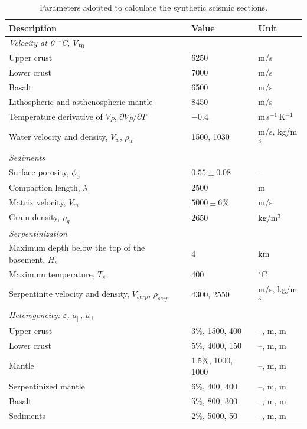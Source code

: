 \begin{table}[ht]
  \centering
  \caption{Parameters adopted to calculate the synthetic seismic sections.}
  \label{tab:seismic}
  \small
  \begin{tabular}{lll}
    \toprule
    Description & Value & Unit \\
    \midrule
    \multicolumn{3}{l}{\textit{Velocity at 0~$^\circ$C, $V_{P0}$}} \\
    \quad Upper crust & 6250 & m/s \\
    \quad Lower crust & 7000 & m/s \\
    \quad Basalt & 6500 & m/s \\
    \quad Lithospheric and asthenospheric mantle & 8450 & m/s \\
    Temperature derivative of $V_P$, $\partial V_P / \partial T$ & $-0.4$ & m\,s$^{-1}$\,K$^{-1}$ \\
    Water velocity and density, $V_w$, $\rho_w$ & 1500, 1030 & m/s, kg/m$^3$ \\
    \multicolumn{3}{l}{\textit{Sediments}} \\
    \quad Surface porosity, $\phi_0$ & $0.55 \pm 0.08$ & -- \\
    \quad Compaction length, $\lambda$ & 2500 & m \\
    \quad Matrix velocity, $V_m$ & $5000 \pm 6\%$ & m/s \\
    \quad Grain density, $\rho_g$ & 2650 & kg/m$^3$ \\
    \multicolumn{3}{l}{\textit{Serpentinization}} \\
    \quad Maximum depth below the top of the basement, $H_s$ & 4 & km \\
    \quad Maximum temperature, $T_s$ & 400 & $^\circ$C \\
    \quad Serpentinite velocity and density, $V_{serp}$, $\rho_{serp}$ & 4300, 2550 & m/s, kg/m$^3$ \\
    \multicolumn{3}{l}{\textit{Heterogeneity: $\varepsilon$, $a_{\parallel}$, $a_{\perp}$}} \\
    \quad Upper crust & 3\%, 1500, 400 & --, m, m \\
    \quad Lower crust & 5\%, 4000, 150 & --, m, m \\
    \quad Mantle & 1.5\%, 1000, 1000 & --, m, m \\
    \quad Serpentinized mantle & 6\%, 400, 400 & --, m, m \\
    \quad Basalt & 5\%, 800, 300 & --, m, m \\
    \quad Sediments & 2\%, 5000, 50 & --, m, m \\

\end{tabular}
\end{table}
